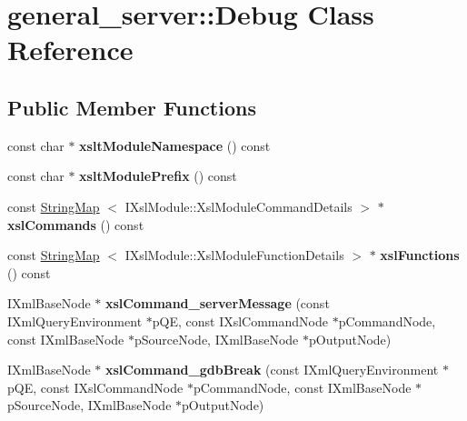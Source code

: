 \hypertarget{classgeneral__server_1_1Debug}{\section{general\-\_\-server\-:\-:\-Debug \-Class \-Reference}
\label{classgeneral__server_1_1Debug}
}
\subsection*{\-Public \-Member \-Functions}
\begin{DoxyCompactItemize}
\item 
\hypertarget{classgeneral__server_1_1Debug_a3a48abbc28f9966749e5204a481673b0}{const char $\ast$ {\bfseries xslt\-Module\-Namespace} () const }\label{classgeneral__server_1_1Debug_a3a48abbc28f9966749e5204a481673b0}

\item 
\hypertarget{classgeneral__server_1_1Debug_a1cbd038e2840990a2250444a4f891d10}{const char $\ast$ {\bfseries xslt\-Module\-Prefix} () const }\label{classgeneral__server_1_1Debug_a1cbd038e2840990a2250444a4f891d10}

\item 
\hypertarget{classgeneral__server_1_1Debug_aeec16f1f6fc6cd1a89fee08e494f79fc}{const \hyperlink{classgeneral__server_1_1StringMap}{\-String\-Map}\*
$<$ \-I\-Xsl\-Module\-::\-Xsl\-Module\-Command\-Details $>$ $\ast$ {\bfseries xsl\-Commands} () const }\label{classgeneral__server_1_1Debug_aeec16f1f6fc6cd1a89fee08e494f79fc}

\item 
\hypertarget{classgeneral__server_1_1Debug_af5fcdf191122938cc99a06094c71f4e1}{const \hyperlink{classgeneral__server_1_1StringMap}{\-String\-Map}\*
$<$ \-I\-Xsl\-Module\-::\-Xsl\-Module\-Function\-Details $>$ $\ast$ {\bfseries xsl\-Functions} () const }\label{classgeneral__server_1_1Debug_af5fcdf191122938cc99a06094c71f4e1}

\item 
\hypertarget{group__XSLModule-Commands_gac85d7f913e2f0c513cb70d7f182acac7}{\-I\-Xml\-Base\-Node $\ast$ {\bfseries xsl\-Command\-\_\-server\-Message} (const \-I\-Xml\-Query\-Environment $\ast$p\-Q\-E, const \-I\-Xsl\-Command\-Node $\ast$p\-Command\-Node, const \-I\-Xml\-Base\-Node $\ast$p\-Source\-Node, \-I\-Xml\-Base\-Node $\ast$p\-Output\-Node)}\label{group__XSLModule-Commands_gac85d7f913e2f0c513cb70d7f182acac7}

\item 
\hypertarget{group__XSLModule-Commands_ga368a459f34d22a2ed966877e93af86f8}{\-I\-Xml\-Base\-Node $\ast$ {\bfseries xsl\-Command\-\_\-gdb\-Break} (const \-I\-Xml\-Query\-Environment $\ast$p\-Q\-E, const \-I\-Xsl\-Command\-Node $\ast$p\-Command\-Node, const \-I\-Xml\-Base\-Node $\ast$p\-Source\-Node, \-I\-Xml\-Base\-Node $\ast$p\-Output\-Node)}\label{group__XSLModule-Commands_ga368a459f34d22a2ed966877e93af86f8}


\end{DoxyCompactItemize}
